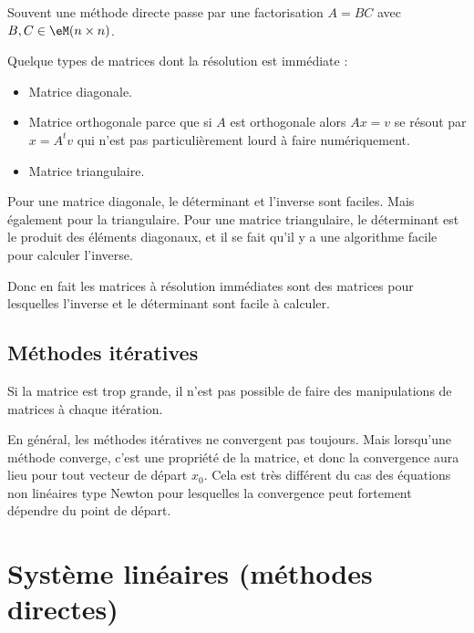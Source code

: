 Souvent une méthode directe passe par une factorisation \( A=BC\) avec \( B,C\in \eM(n\times n)\).

Quelque types de matrices dont la résolution est immédiate :
\begin{itemize}
    \item Matrice diagonale.
    \item Matrice orthogonale parce que si \( A\) est orthogonale alors \( Ax=v\) se résout par \( x=A^tv\) qui n'est pas particulièrement lourd à faire numériquement.
    \item Matrice triangulaire.
\end{itemize}

\begin{remark}
    Pour une matrice diagonale, le déterminant et l'inverse sont faciles. Mais également pour la triangulaire. Pour une matrice triangulaire, le déterminant est le produit des éléments diagonaux, et il se fait qu'il y a une algorithme facile pour calculer l'inverse.

    Donc en fait les matrices à résolution immédiates sont des matrices pour lesquelles l'inverse et le déterminant sont facile à calculer.
\end{remark}

\subsection{Méthodes itératives}

Si la matrice est trop grande, il n'est pas possible de faire des manipulations de matrices à chaque itération.

En général, les méthodes itératives ne convergent pas toujours. Mais lorsqu'une méthode converge, c'est une propriété de la matrice, et donc la convergence aura lieu pour tout vecteur de départ \( x_0\). Cela est très différent du cas des équations non linéaires type Newton pour lesquelles la convergence peut fortement dépendre du point de départ.

\section{Système linéaires (méthodes directes)}


